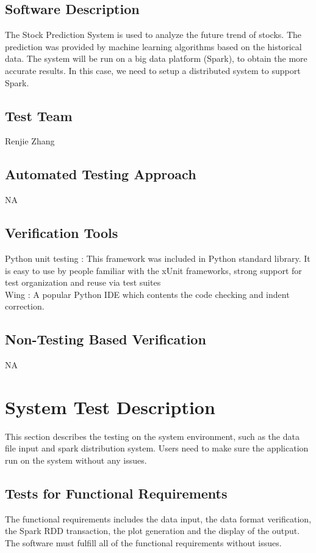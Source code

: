 \documentclass[12pt, titlepage]{article}
\begin{document}
\subsection{Software Description}
The Stock Prediction System is used to analyze the future trend of stocks. The prediction was provided by machine learning algorithms based on the historical data. 
The system will be run on a big data platform (Spark), to obtain the more accurate results. In this case, we need to setup a distributed system to support Spark.
\subsection{Test Team}

Renjie Zhang

\subsection{Automated Testing Approach}
NA
\subsection{Verification Tools}
Python unit testing : This framework was included in Python standard library. It is easy to use by people familiar with the xUnit frameworks, strong support for test organization and reuse via test suites\\
Wing : A popular Python IDE which contents the code checking and indent correction.\\


\subsection{Non-Testing Based Verification}
NA

\section{System Test Description}
This section describes the testing on the system environment, such as the data file input and spark distribution system. Users need to make sure the application run on the system without any issues. 
\subsection{Tests for Functional Requirements}
The functional requirements includes the data input, the data format verification, the Spark RDD transaction, the plot generation and the display of the output. The software must fulfill all of the functional requirements without issues.
\end{document}
